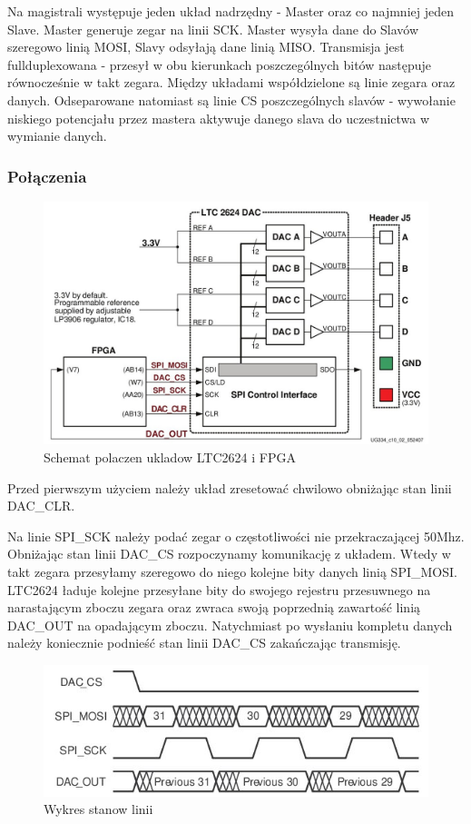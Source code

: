 \documentclass[a4paper,12pt]{article}
\begin{document}
Na magistrali występuje jeden układ nadrzędny - Master oraz co najmniej jeden Slave.
Master generuje zegar na linii SCK.
Master wysyła dane do Slavów szeregowo linią MOSI, Slavy odsyłają dane linią MISO. Transmisja jest fullduplexowana - przesył w obu kierunkach poszczególnych bitów następuje równocześnie w takt zegara.
Między układami współdzielone są linie zegara oraz danych. Odseparowane natomiast są linie CS poszczególnych slavów - wywołanie niskiego potencjału przez mastera aktywuje danego slava do uczestnictwa w wymianie danych.


\newpage
\subsubsection{Połączenia}

\begin{figure}[htb]
   \centering
   \includegraphics[width=15cm]{grafika/dac.jpg}
   \caption{Schemat polaczen ukladow LTC2624 i FPGA}
\end{figure}

Przed pierwszym użyciem należy układ zresetować chwilowo obniżając stan linii DAC\_CLR.

Na linie SPI\_SCK należy podać zegar o częstotliwości nie przekraczającej 50Mhz. Obniżając stan linii DAC\_CS rozpoczynamy komunikację z układem. Wtedy w takt zegara przesyłamy szeregowo do niego kolejne bity danych linią SPI\_MOSI. LTC2624 ładuje kolejne przesyłane bity do swojego rejestru przesuwnego na narastającym zboczu zegara oraz zwraca swoją poprzednią zawartość linią DAC\_OUT na opadającym zboczu. Natychmiast po wysłaniu kompletu danych należy koniecznie podnieść stan linii DAC\_CS zakańczając transmisję.

\begin{figure}[htb]
   \centering
   \includegraphics[width=15cm]{grafika/dac-waveform.jpg}
   \caption{Wykres stanow linii}
\end{figure}
\end{document}
